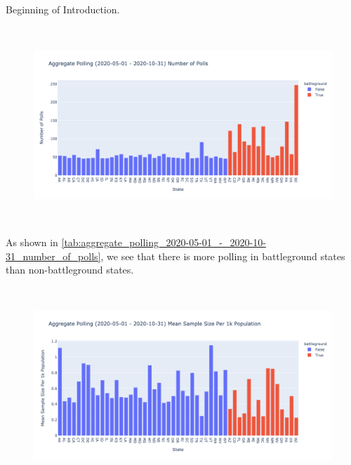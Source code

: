 Beginning of Introduction.
\begin{figure}[H]
    \centering
    \includegraphics[height=20em]{figures/aggregate_polling_2020-05-01_-_2020-10-31_number_of_polls.png}
    \label{fig:aggregate_polling_2020-05-01_-_2020-10-31_number_of_polls}
\end{figure}

\begin{table}[H]

    \label{tab:aggregate_polling_2020-05-01_-_2020-10-31_number_of_polls}
\end{table}

As shown in \ref{tab:aggregate_polling_2020-05-01_-_2020-10-31_number_of_polls}, we see that there is more polling in battleground states than non-battleground states.\\

\begin{figure}[H]
    \centering
    \includegraphics[height=20em]{figures/aggregate_polling_2020-05-01_-_2020-10-31_mean_sample_size_per_1k_population.png}
    \label{fig:aggregate_polling_2020-05-01_-_2020-10-31_mean_sample_size_per_1k_population}
\end{figure}

\begin{table}[H]

    \label{tab:aggregate_polling_2020-05-01_-_2020-10-31_mean_sample_size_per_1k_population}
\end{table}

